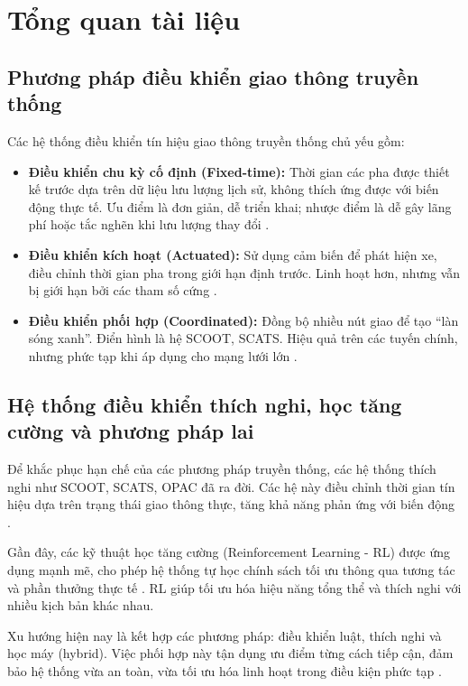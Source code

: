 \chapter{Tổng quan tài liệu}

\section{Phương pháp điều khiển giao thông truyền thống}

Các hệ thống điều khiển tín hiệu giao thông truyền thống chủ yếu gồm:
\begin{itemize}
    \item \textbf{Điều khiển chu kỳ cố định (Fixed-time):} Thời gian các pha được thiết kế trước dựa trên dữ liệu lưu lượng lịch sử, không thích ứng được với biến động thực tế. Ưu điểm là đơn giản, dễ triển khai; nhược điểm là dễ gây lãng phí hoặc tắc nghẽn khi lưu lượng thay đổi \cite{Webster1958, Urbanik2015}.
    \item \textbf{Điều khiển kích hoạt (Actuated):} Sử dụng cảm biến để phát hiện xe, điều chỉnh thời gian pha trong giới hạn định trước. Linh hoạt hơn, nhưng vẫn bị giới hạn bởi các tham số cứng \cite{Koonce2008}.
    \item \textbf{Điều khiển phối hợp (Coordinated):} Đồng bộ nhiều nút giao để tạo “làn sóng xanh”. Điển hình là hệ SCOOT, SCATS. Hiệu quả trên các tuyến chính, nhưng phức tạp khi áp dụng cho mạng lưới lớn \cite{Hunt1981, Lowrie1990}.
\end{itemize}

\section{Hệ thống điều khiển thích nghi, học tăng cường và phương pháp lai}

Để khắc phục hạn chế của các phương pháp truyền thống, các hệ thống thích nghi như SCOOT, SCATS, OPAC đã ra đời. Các hệ này điều chỉnh thời gian tín hiệu dựa trên trạng thái giao thông thực, tăng khả năng phản ứng với biến động \cite{Eom2020}. 

Gần đây, các kỹ thuật học tăng cường (Reinforcement Learning - RL) được ứng dụng mạnh mẽ, cho phép hệ thống tự học chính sách tối ưu thông qua tương tác và phần thưởng thực tế \cite{Abdulhai2003, Li2016}. RL giúp tối ưu hóa hiệu năng tổng thể và thích nghi với nhiều kịch bản khác nhau.

Xu hướng hiện nay là kết hợp các phương pháp: điều khiển luật, thích nghi và học máy (hybrid). Việc phối hợp này tận dụng ưu điểm từng cách tiếp cận, đảm bảo hệ thống vừa an toàn, vừa tối ưu hóa linh hoạt trong điều kiện phức tạp \cite{Wei2019}.

